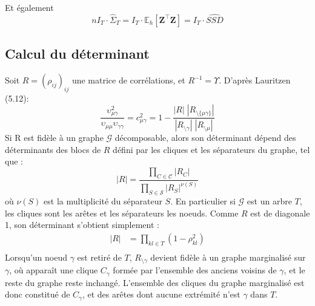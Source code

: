 \documentclass[11pt,a4paper]{article}
\newcommand{\Zbf}{\boldsymbol{Z}}
\newcommand{\Esp}{\mathds{E}}
\begin{document}
Et également 
$$\boxed{n I_T\cdot \hat{\Sigma}_T = I_T\cdot \Esp_h[\Zbf^\intercal \Zbf] = I_T\cdot \widehat{SSD}}$$
\subsection{Calcul du déterminant}
Soit $R=(\rho_{ij})_{ij}$ une matrice de corrélations, et $R^{-1}= \Upsilon$. D'après Lauritzen (5.12):
$$\frac{\upsilon_{\mu\gamma}^2}{\upsilon_{\mu\mu}\upsilon_{\gamma\gamma}} = c_{\mu\gamma}^2 = 1-\frac{|R|\;|R_{\setminus \{\mu\gamma\}}|}{|R_{\setminus\gamma}|\;|R_{\setminus \mu}|} $$
Si R est fidèle à un graphe $\mathcal{G}$ décomposable, alors son déterminant dépend des déterminants des blocs de $R$ défini par les cliques et les séparateurs du graphe, tel que :
$$|R| = \frac{\prod_{C \in \mathcal{C}} |R_C|}{\prod_{S \in \mathcal{S}} |R_S|^{\nu(S)}} $$
où $\nu(S)$ est la multiplicité du séparateur $S$. En particulier si $\mathcal{G}$ est un arbre $T$, les cliques sont les arêtes et les séparateurs les noeuds. Comme $R$ est de diagonale 1, son déterminant s'obtient simplement :
\begin{align*}
    |R| &=  \prod_{kl\in T} (1-\rho_{kl}^2)\\
\end{align*}
Lorsqu'un noeud $\gamma$ est retiré de $T$, $R_{\setminus \gamma}$ devient fidèle à un graphe marginalisé sur $\gamma$, où apparaît une clique $C_\gamma$ formée par l'ensemble des anciens voisins de $\gamma$, et le reste du graphe reste inchangé. L'ensemble des cliques du graphe marginalisé est donc constitué de $C_\gamma$, et des arêtes dont aucune extrémité n'est $\gamma$ dans $T$.
\end{document}
